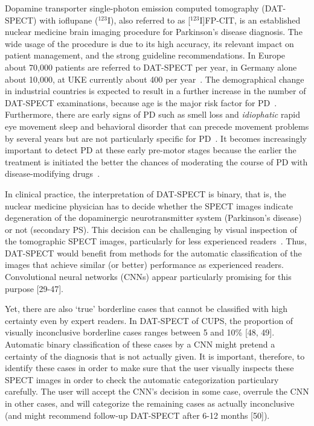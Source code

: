 Dopamine transporter single-photon emission computed tomography (DAT-SPECT) 
with ioflupane ($^{123}$I), also referred to as [$^{123}$I]FP-CIT, is an established nuclear medicine brain imaging procedure for Parkinson's disease diagnosis.
The wide usage of the procedure is due to its high accuracy, its relevant impact on patient management, 
and the strong guideline recommendations.
In Europe about 70,000 patients are referred to DAT-SPECT per year, in Germany alone about 10,000, at UKE currently about 400 per year~\citep{Marienhagen2017}.
The demographical change in industrial countries is expected to result in a further increase in the number of DAT-SPECT examinations, 
because age is the major risk factor for PD~\citep{Reeve2014}.
Furthermore, there are early signs of PD such as smell loss and \textit{idiophatic} rapid eye movement sleep and behavioral disorder 
that can precede movement problems by several years but are not particularly specific for PD~\citep{Iranzo2017, Postuma2019may, Postuma2019mar}.
It becomes increasingly important to detect PD at these early pre-motor stages because the earlier the treatment is initiated the better 
the chances of moderating the course of PD with disease-modifying drugs~\citep{Kim2017}.


In clinical practice, the interpretation of DAT-SPECT is binary, that is, the nuclear medicine physician has to decide whether the SPECT images 
indicate degeneration of the dopaminergic neurotransmitter system (Parkinson's disease) or not (secondary PS). 
This decision can be challenging by visual inspection of the tomographic SPECT images, particularly for less experienced readers~\citep{Schiebler2023}.
Thus, DAT-SPECT would benefit from methods for the automatic classification of the images that achieve similar (or better) performance as experienced readers. 
Convolutional neural networks (CNNs) appear particularly promising for this purpose [29-47].


Yet, there are also `true' borderline cases that cannot be classified with high certainty even by expert readers. 
In DAT-SPECT of CUPS, the proportion of visually inconclusive borderline cases ranges between 5 and 10\% [48, 49]. 
Automatic binary classification of these cases by a CNN might pretend a certainty of the diagnosis that is not actually given. 
It is important, therefore, to identify these cases in order to make sure that the user visually inspects these SPECT images 
in order to check the automatic categorization particulary carefully. 
The user will accept the CNN's decision in some case, overrule the CNN in other cases, and will categorize the remaining cases as 
actually inconclusive (and might recommend follow-up DAT-SPECT after 6-12 months [50]). 

